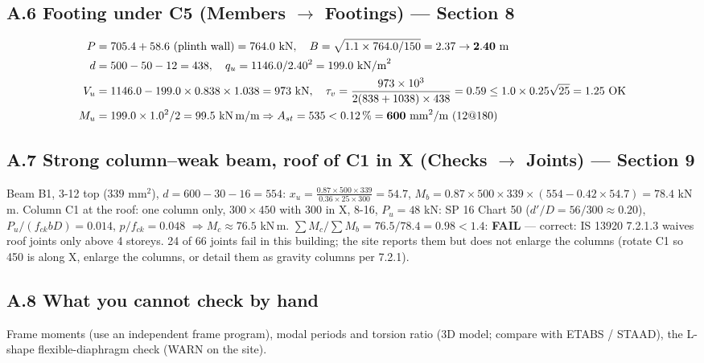 \documentclass[10pt,a4paper]{article}
\newcommand{\fck}{f_{ck}}
\begin{document}
\subsection*{A.6 Footing under C5 (Members $\rightarrow$ Footings) --- Section 8}
\begin{align*}
P&=705.4+58.6\ (\text{plinth wall})=764.0\ \text{kN},\quad B=\sqrt{1.1\times764.0/150}=2.37\rightarrow\mathbf{2.40}\ \text{m}\\
d&=500-50-12=438,\quad q_u=1146.0/2.40^2=199.0\ \text{kN/m}^2\\
V_u&=1146.0-199.0\times0.838\times1.038=973\ \text{kN},\quad
\tau_v=\frac{973\times10^3}{2(838+1038)\times438}=0.59\le1.0\times0.25\sqrt{25}=1.25\ \text{OK}\\
M_u&=199.0\times1.0^2/2=99.5\ \text{kN\,m/m}\Rightarrow A_{st}=535<0.12\,\%=\mathbf{600}\ \text{mm}^2/\text{m}\ (12@180)
\end{align*}

\subsection*{A.7 Strong column--weak beam, roof of C1 in X (Checks $\rightarrow$ Joints) --- Section 9}
Beam B1, 3-12 top ($339$ mm$^2$), $d=600-30-16=554$:
$x_u=\frac{0.87\times500\times339}{0.36\times25\times300}=54.7$,
$M_b=0.87\times500\times339\times(554-0.42\times54.7)=\mathbf{78.4}$ kN\,m.
Column C1 at the roof: one column only, $300\times450$ with 300 in X, 8-16, $P_u=48$ kN: SP 16 Chart 50
($d'/D=56/300\approx0.20$), $P_u/(\fck bD)=0.014$, $p/\fck=0.048$ $\Rightarrow M_c\approx76.5$ kN\,m.
$\sum M_c/\sum M_b=76.5/78.4=\mathbf{0.98}<1.4$: \textbf{FAIL} --- correct: IS 13920 7.2.1.3 waives roof joints only
above 4 storeys. 24 of 66 joints fail in this building; the site reports them but does not enlarge the columns
(rotate C1 so 450 is along X, enlarge the columns, or detail them as gravity columns per 7.2.1).

\subsection*{A.8 What you cannot check by hand}
Frame moments (use an independent frame program), modal periods and torsion ratio (3D model; compare with ETABS /
STAAD), the L-shape flexible-diaphragm check (WARN on the site).
\end{document}
